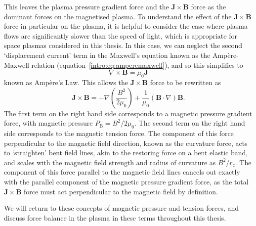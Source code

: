 This leaves the plasma pressure gradient force and the $\boldsymbol{J}\times\boldsymbol{B}$ force as the dominant forces on the magnetised plasma. To understand the effect of the $\boldsymbol{J}\times\boldsymbol{B}$ force in particular on the plasma, it is helpful to consider the case where plasma flows are significantly slower than the speed of light, which is appropriate for space plasmas considered in this thesis. In this case, we can neglect the second `displacement current' term in the Maxwell's equation known as the Amp\`ere-Maxwell relation (equation~\ref{intro:eq:amperemaxwell}), and so this simplifies to 
\begin{equation}\label{intro:eq:ampere}
\nabla \times \boldsymbol{B} = \mu_0 \boldsymbol{J} 
\end{equation}
known as Amp\`ere's Law. This allows the $\boldsymbol{J}\times\boldsymbol{B}$ force to be rewritten as
\begin{equation}\label{intro:eq:bpressuretension}
\boldsymbol{J}\times\boldsymbol{B} = -\nabla\left(\frac{B^2}{2\mu_0}\right)+\frac{1}{\mu_0}(\boldsymbol{B}\cdot\nabla)\boldsymbol{B}.
\end{equation}
The first term on the right hand side corresponds to a magnetic pressure gradient force, with magnetic pressure $P_\mathrm{B} = B^2/2\mu_0$. The second term on the right hand side corresponds to the magnetic tension force. The component of this force perpendicular to the magnetic field direction, known as the curvature force, acts to `straighten' bent field lines, akin to the restoring force on a bent elastic band, and scales with the magnetic field strength and radius of curvature as $B^2/r_\mathrm{c}$. The component of this force parallel to the magnetic field lines cancels out exactly with the parallel component of the magnetic pressure gradient force, as the total $\boldsymbol{J}\times\boldsymbol{B}$ force must act perpendicular to the magnetic field by definition.

We will return to these concepts of magnetic pressure and tension forces, and discuss force balance in the plasma in these terms throughout this thesis.

